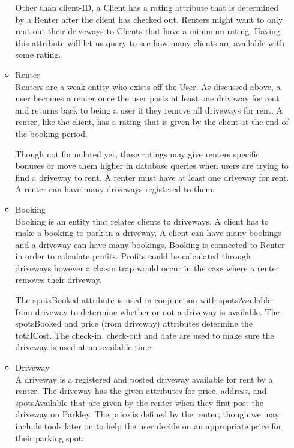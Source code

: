\documentclass[a4paper]{article}
\begin{document}
\begin{enumerate}
\begin{itemize}
Other than client-ID, a Client has a rating attribute that is determined by a Renter after the client has checked out. Renters might want to only rent out their driveways to Clients that have a minimum rating. Having this attribute will let us query to see how many clients are available with some rating.

\item Renter
\\

Renters are a weak entity who exists off the User. As discussed above, a user becomes a renter once the user posts at least one driveway for rent and returns back to being a user if they remove all driveways for rent. A renter, like the client, has a rating that is given by the client at the end of the booking period. 


Though not formulated yet, these ratings may give renters specific bonuses or move them higher in database queries when users are trying to find a driveway to rent. A renter must have at least one driveway for rent. A renter can have many driveways registered to them.

\item Booking
\\

Booking is an entity that relates clients to driveways. A client has to make a booking to park in a driveway. A client can have many bookings and a driveway can have many bookings. Booking is connected to Renter in order to calculate profits. Profits could be calculated through driveways however a chasm trap would occur in the case where a renter removes their driveway.

The spotsBooked attribute is used in conjunction with spotsAvailable from driveway to determine whether or not a driveway is available. The spotsBooked and price (from driveway) attributes determine the totalCost. The check-in, check-out and date are used to make sure the driveway is used at an available time.

\item Driveway
\\

A driveway is a registered and posted driveway available for rent by a renter. The driveway has the given attributes for price, address, and spotsAvailable that are given by the renter when they first post the driveway on Parkley. The price is defined by the renter, though we may include tools later on to help the user decide on an appropriate price for their parking spot. 


\end{itemize}
\end{enumerate}
\end{document}
